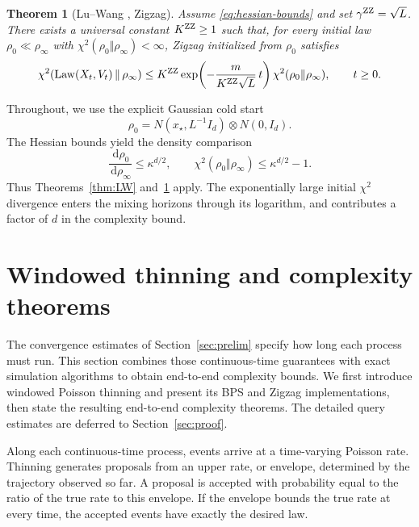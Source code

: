 \documentclass{amsart}
\theoremstyle{plain}
\newtheorem{theorem}{Theorem}
\theoremstyle{definition}
\theoremstyle{remark}
\newcommand{\ud}{\,\mathrm{d}}
\newcommand{\1}{\mathbf 1}
\newcommand{\dd}{\ud}
\DeclareMathOperator{\Law}{Law}
\newcommand{\zz}{{\rm ZZ}}
\begin{document}
\begin{theorem}[Lu--Wang \cite{LuWangZigzag}, Zigzag]\label{thm:LW-ZZ}
Assume \eqref{eq:hessian-bounds} and set $\gamma^{\zz}=\sqrt L$.  There exists
a universal constant $K^{\zz}\ge1$ such that, for every initial law
$\rho_0\ll\rho_\infty$ with
$\chi^2(\rho_0\Vert\rho_\infty)<\infty$, Zigzag initialized from $\rho_0$
satisfies
\begin{equation}\label{eq:LW-ZZ}
        \chi^2\!\left(
          \Law(X_t,V_t)\,\middle\Vert\,\rho_\infty
        \right)
        \le K^{\zz}
        \exp\!\left(-\frac{m}{K^{\zz}\sqrt L}\,t\right)
        \chi^2(\rho_0\Vert\rho_\infty),
        \qquad t\ge0.
\end{equation}
\end{theorem}

Throughout, we use the explicit Gaussian cold start
\begin{equation}\label{eq:cold-start}
        \rho_0= N(x_\star,L^{-1}I_d)\otimes N(0,I_d).
\end{equation}
The Hessian bounds yield the density comparison
\begin{equation}\label{eq:cold-start-chi2}
        \frac{\dd\rho_0}{\dd\rho_\infty}\le\kappa^{d/2},
        \qquad
        \chi^2(\rho_0\Vert\rho_\infty)\le\kappa^{d/2}-1.
\end{equation}
Thus Theorems~\ref{thm:LW} and~\ref{thm:LW-ZZ} apply.  The
exponentially large initial $\chi^2$ divergence enters the mixing horizons
through its logarithm, and contributes a factor of $d$ in the complexity bound.

\section{Windowed thinning and complexity theorems}\label{sec:wt}

The convergence estimates of Section~\ref{sec:prelim} specify how long each
process must run.  This section combines those continuous-time guarantees with
exact simulation algorithms to obtain end-to-end complexity bounds. We first introduce windowed Poisson thinning and
present its BPS and Zigzag implementations, then state the resulting
end-to-end complexity theorems.  The detailed query estimates are deferred to
Section~\ref{sec:proof}.

Along each continuous-time process, events arrive at a time-varying Poisson
rate.  Thinning generates proposals from an upper rate, or envelope, determined
by the trajectory observed so far.  A proposal is accepted with probability
equal to the ratio of the true rate to this envelope.  If the envelope bounds
the true rate at every time, the accepted events have exactly the desired law.
\end{document}

